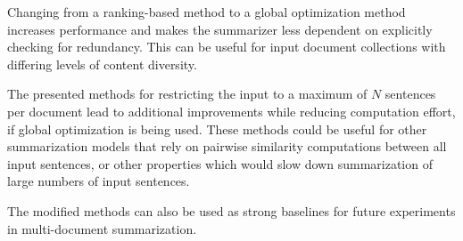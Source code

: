 \documentclass[11pt,letterpaper]{article}
\begin{document}
Changing from a ranking-based method to a global optimization method increases performance and makes the summarizer less dependent on explicitly checking for redundancy. This can be useful for input document collections with differing levels of content diversity.

The presented methods for restricting the input to a maximum of $N$ sentences per document lead to additional improvements while reducing computation effort, if global optimization is being used. These methods could be useful for other summarization models that rely on pairwise similarity computations between all input sentences, or other properties which would slow down summarization of large numbers of input sentences.

The modified methods can also be used as strong baselines for future experiments in multi-document summarization. 


\end{document}
